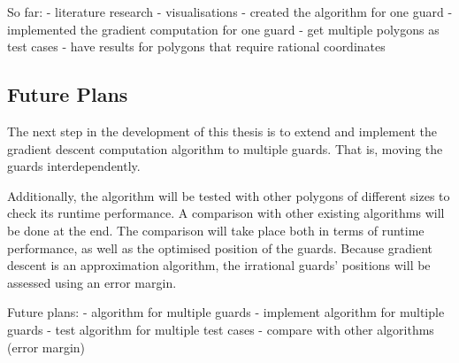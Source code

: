 So far:
- literature research
- visualisations
- created the algorithm for one guard
- implemented the gradient computation for one guard
- get multiple polygons as test cases
- have results for polygons that require rational coordinates

\subsection{Future Plans}
The next step in the development of this thesis is to extend and implement the gradient descent computation algorithm to multiple guards. That is, moving the guards interdependently.

Additionally, the algorithm will be tested with other polygons of different sizes to check its runtime performance. A comparison with other existing algorithms will be done at the end. The comparison will take place both in terms of runtime performance, as well as the optimised position of the guards. Because gradient descent is an approximation algorithm, the irrational guards' positions will be assessed using an error margin.

Future plans:
- algorithm for multiple guards
- implement algorithm for multiple guards
- test algorithm for multiple test cases 
- compare with other algorithms (error margin)